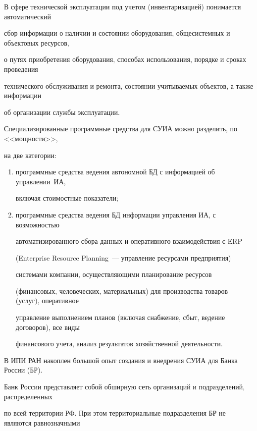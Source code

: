 В сфере технической эксплуатации под учетом (инвентаризацией) понимается автоматический 


сбор информации о наличии и состоянии оборудования, обще\-сис\-тем\-ных и объектовых ресурсов, 


о путях приобретения оборудования, способах использования, порядке и сроках проведения 


технического обслуживания и ремонта, состоянии учитываемых объектов, а также информации 


об организации службы эксплуатации.





Специализированные программные средства для СУИА можно разделить, по <<мощности>>, 


на две категории:


\begin{enumerate}[(1)]


\item программные средства ведения автономной БД с информацией об управлении~ИА, 


включая стоимостные показатели;


\item программные средства ведения БД информации управления ИА, с возможностью 


автоматизированного сбора данных и оперативного взаимодействия с ERP 


(Enterprise Resource Planning~--- управление ресурсами предприятия) 


сис\-те\-ма\-ми компании, осуществляющими планирование ресурсов 


(финансовых, человеческих, материальных) для производства товаров (услуг), оперативное 


управ\-ле\-ние выполнением планов (включая снабжение, сбыт, ведение договоров), все виды 


финансового учета, анализ результатов хозяйственной деятельности.


\end{enumerate}





В ИПИ РАН накоплен большой опыт создания и внедрения СУИА для Банка России (БР). 


Банк России представляет собой обширную сеть организаций и подразделений, распределенных 


по всей территории РФ. При этом территориальные подразделения БР не являются равнозначными 



